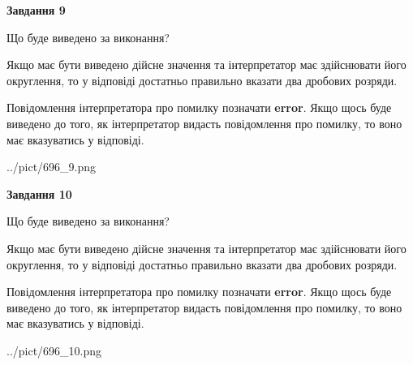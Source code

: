 \documentclass[12pt, ukrainian]{article}
\begin{document}
{\begin {Large}
{\begin {center}\textbf{Завдання 9}\end {center}}\par
Що буде виведено за виконання? \par

Якщо має бути виведено дійсне значення та інтерпретатор має здійснювати його округлення, 
то у відповіді достатньо правильно вказати два дробових розряди.

Повідомлення інтерпретатора про помилку позначати \textbf{error}.
Якщо щось буде виведено до того, як інтерпретатор видасть повідомлення про помилку, 
то воно має вказуватись у відповіді. \par

\begin{center}
	{../pict/696_9.png}
\end{center}
\newpage

{\begin {center}\textbf{Завдання 10}\end {center}}\par
Що буде виведено за виконання? \par

Якщо має бути виведено дійсне значення та інтерпретатор має здійснювати його округлення, 
то у відповіді достатньо правильно вказати два дробових розряди.

Повідомлення інтерпретатора про помилку позначати \textbf{error}.
Якщо щось буде виведено до того, як інтерпретатор видасть повідомлення про помилку, 
то воно має вказуватись у відповіді. \par

\begin{center}
	{../pict/696_10.png}
\end{center}
\newpage

\end {Large}}
\end{document}
